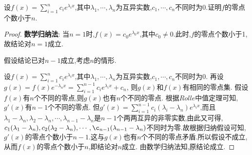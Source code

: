 \documentclass[lang=cn,newtx,10pt,scheme=chinese]{../Template/elegantbook}
\begin{document}
\begin{exercise}
    设\(f(x)=\sum_{i = 1}^{n}c_{i}e^{\lambda_{i}x}\),其中\(\lambda_1,\cdots,\lambda_n\)为互异实数,\(c_1,\cdots,c_n\)不同时为\(0\).证明\(f\)的零点个数小于\(n\).
    \end{exercise}
\begin{proof}
        \textbf{数学归纳法}:
        当$n=1$时,$f(x)=c_0e^{\lambda_0 x}$,其中$c_0\ne0$.此时,$f$的零点个数小于1,故结论对$n=1$成立.

        假设结论已对$n-1$成立,考虑$n$的情形.
        
        设$f(x)=\sum_{i=1}^{n} c_ie^{\lambda_ix}$,其中\(\lambda_1,\cdots,\lambda_n\)为互异实数,\(c_1,\cdots,c_n\)不同时为\(0\).
        再设$g(x)=f(x)e^{-\lambda_nx}=\sum_{i=1}^{n-1} c_ie^{\lambda_ix}+c_n$,
        则$g(x)$和$f(x)$有相同的零点集.
        假设$f(x)$有$n$个不同的零点,则$g(x)$也有$n$个不同的零点.
        根据$Rolle$中值定理可知,$g'(x)$有$n-1$个不同的零点.
        但$g'(x)=\sum_{i=1}^{n-1} c_i(\lambda_i-\lambda_n)e^{\lambda_ix}$,而且$\lambda_1-\lambda_n,\lambda_2-\lambda_n,\cdots,\lambda_{n-1}-\lambda_n$是$n-1$个两两互异的非零实数,由此又可得,$c_1(\lambda_1-\lambda_n),c_2(\lambda_2-\lambda_n),\cdots,\c_{n-1}(\lambda_{n-1}-\lambda_n)$不同时为零.故根据归纳假设可知,$g'(x)$的零点个数小于$n-1$.这与$g(x)$也有$n$个不同的零点矛盾.所以假设不成立,从而$f(x)$的零点个数小于$n$,即结论对$n$成立.
        由数学归纳法知,原结论成立.

\end{proof}
\end{document}
